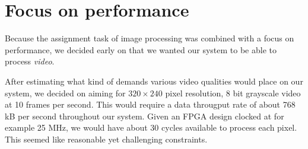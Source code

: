 \section{Focus on performance}

Because the assignment task of image processing was combined with a
focus on performance, we decided early on that we wanted our system to
be able to process \emph{video}.

After estimating what kind of demands various video qualities would
place on our system, we decided on aiming for $320\times240$ pixel
resolution, 8 bit grayscale video at 10 frames per second. This would
require a data througput rate of about 768 kB per second throughout our
system. Given an FPGA design clocked at for example 25 MHz, we would
have about 30 cycles available to process each pixel. This seemed
like reasonable yet challenging constraints.

